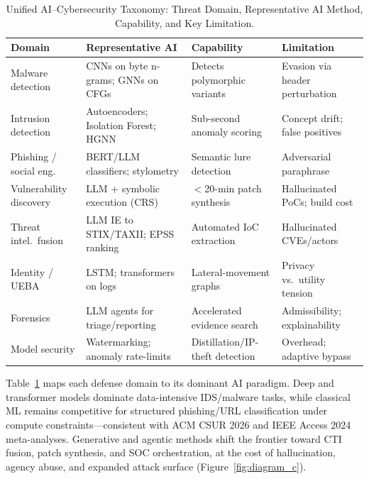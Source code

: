 \documentclass[conference,10pt,twocolumn,a4paper]{IEEEtran}
\begin{document}
\begin{table}[t]
\caption{Unified AI--Cybersecurity Taxonomy: Threat Domain, Representative AI Method, Capability, and Key Limitation.}
\label{tab:taxonomy}
\centering
\footnotesize
\begin{tabular}{llll}
\toprule
\textbf{Domain} & \textbf{Representative AI} & \textbf{Capability} & \textbf{Limitation} \\
\midrule
Malware detection & CNNs on byte n-grams; GNNs on CFGs & Detects polymorphic variants & Evasion via header perturbation \\
Intrusion detection & Autoencoders; Isolation Forest; HGNN & Sub-second anomaly scoring & Concept drift; false positives \\
Phishing / social eng.\ & BERT/LLM classifiers; stylometry & Semantic lure detection & Adversarial paraphrase \\
Vulnerability discovery & LLM + symbolic execution (CRS) & $<$20-min patch synthesis & Hallucinated PoCs; build cost \\
Threat intel.\ fusion & LLM IE to STIX/TAXII; EPSS ranking & Automated IoC extraction & Hallucinated CVEs/actors \\
Identity / UEBA & LSTM; transformers on logs & Lateral-movement graphs & Privacy vs.\ utility tension \\
Forensics & LLM agents for triage/reporting & Accelerated evidence search & Admissibility; explainability \\
Model security & Watermarking; anomaly rate-limits & Distillation/IP-theft detection & Overhead; adaptive bypass \\
\bottomrule
\end{tabular}
\end{table}

Table~\ref{tab:taxonomy} maps each defense domain to its dominant AI paradigm. Deep and transformer models dominate data-intensive IDS/malware tasks, while classical ML remains competitive for structured phishing/URL classification under compute constraints---consistent with ACM CSUR 2026 and IEEE Access 2024 meta-analyses. Generative and agentic methods shift the frontier toward CTI fusion, patch synthesis, and SOC orchestration, at the cost of hallucination, agency abuse, and expanded attack surface (Figure~\ref{fig:diagram_c}).
\end{document}
